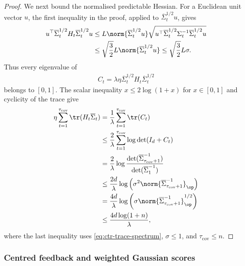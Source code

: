 \begin{proof}
    We next bound the normalised predictable Hessian.  For a Euclidean unit
    vector $u$, the first inequality in the proof, applied to
    $\overline\Sigma_t^{1/2}u$, gives
    \begin{align}
        u^\top\overline\Sigma_t^{1/2}H_t
        \overline\Sigma_t^{1/2}u
         & \leq
        L\norm{\overline\Sigma_t^{1/2}u}
        \sqrt{
            u^\top\overline\Sigma_t^{1/2}
            \Sigma_t^{-1}
            \overline\Sigma_t^{1/2}u
        }
        \\
         & \leq\sqrt{\frac32}L
        \norm{\overline\Sigma_t^{1/2}u}
        \leq\sqrt{\frac32}L\sigma.
    \end{align}
    Thus every eigenvalue of
    \begin{align}
        C_t=\lambda\eta
        \overline\Sigma_t^{1/2}H_t\overline\Sigma_t^{1/2}
    \end{align}
    belongs to $[0,1]$.  The scalar inequality
    $x\leq2\log(1+x)$ for $x\in[0,1]$ and cyclicity of the trace give
    \begin{align}
        \eta\sum_{t=1}^{\tau_{\mathrm{cov}}}
        \tr(H_t\overline\Sigma_t)
         & =\frac1\lambda
        \sum_{t=1}^{\tau_{\mathrm{cov}}}\tr(C_t)
        \\
         & \leq\frac2\lambda
        \sum_{t=1}^{\tau_{\mathrm{cov}}}
        \log\det(I_d+C_t)
        \\
         & =\frac2\lambda
        \log\frac{
            \det(\overline\Sigma_{\tau_{\mathrm{cov}}+1}^{-1})
        }{
            \det(\overline\Sigma_1^{-1})
        }
        \\
         & \leq\frac{2d}\lambda
        \log\left(
        \sigma^2
        \norm{\overline\Sigma_{\tau_{\mathrm{cov}}+1}^{-1}}_{\op}
        \right)
        \\
         & =\frac{4d}\lambda
        \log\left(
        \sigma
        \norm{\overline\Sigma_{\tau_{\mathrm{cov}}+1}^{-1}}_{\op}^{1/2}
        \right)
        \\
         & \leq\frac{4d\log(1+n)}\lambda,
    \end{align}
    where the last inequality uses
    \eqref{eq:ctr-trace-spectrum}, $\sigma\leq1$, and
    $\tau_{\mathrm{cov}}\leq n$.
\end{proof}

\subsubsection{Centred feedback and weighted Gaussian scores}

